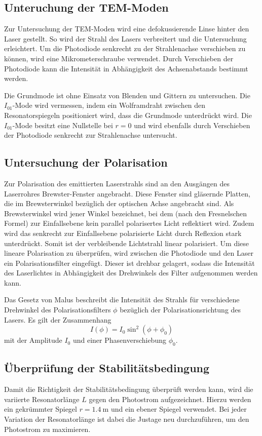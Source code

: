 \subsection{Unteruchung der TEM-Moden}
Zur Untersuchung der TEM-Moden wird eine defokussierende Linse hinter den Laser gestellt.
So wird der Strahl des Lasers verbreitert und die Untersuchung erleichtert.
Um die Photodiode senkrecht zu der Strahlenachse verschieben zu können, wird eine
Mikrometerschraube verwendet. Durch Verschieben der Photodiode kann
die Intensität in Abhängigkeit des Achsenabstands bestimmt werden.

Die Grundmode ist ohne Einsatz von Blenden und Gittern zu untersuchen.
Die $I_{01}$-Mode wird vermessen,
indem ein Wolframdraht zwischen den Resonatorspiegeln positioniert wird,
dass die Grundmode unterdrückt wird.
Die $I_{01}$-Mode besitzt eine Nullstelle bei $r = 0$
und wird ebenfalls durch Verschieben der Photodiode senkrecht zur Strahlenachse
untersucht.

\subsection{Untersuchung der Polarisation}
Zur Polarisation des emittierten Laserstrahls sind an den Ausgängen des
Laserrohres Brewster-Fenster angebracht.
Diese Fenster sind gläsernde Platten, die im Brewsterwinkel bezüglich der
optischen Achse angebracht sind.
Als Brewsterwinkel wird jener Winkel bezeichnet,
bei dem (nach den Fresnelschen Formel) zur
Einfallsebene kein parallel polarisertes Licht reflektiert wird.
Zudem wird das senkrecht zur Einfallsebene polarisierte Licht
durch Reflexion stark unterdrückt.
Somit ist der verbleibende Lichtstrahl linear polarisiert.
Um diese lineare Polarisation zu überprüfen, wird zwischen die Photodiode
und den Laser ein Polarisationsfilter eingefügt.
Dieser ist drehbar gelagert, sodass die Intensität des Laserlichtes in
Abhängigkeit des Drehwinkels des Filter aufgenommen werden kann.

Das Gesetz von Malus beschreibt die Intensität des Strahls für verschiedene
Drehwinkel des Polarisationsfilters $\phi$ bezüglich der Polarisationsrichtung
des Lasers.
Es gilt der Zusammenhang
\begin{equation}
  I\left(\phi\right) = I_0 \sin^2 \left(\phi + \phi_0\right)
  \label{eqn:pol}
\end{equation}
mit der Amplitude $I_0$ und einer Phasenverschiebung $\phi_0$.

\subsection{Überprüfung der Stabilitätsbedingung}
Damit die Richtigkeit der Stabilitätsbedingung überprüft werden kann, wird die
variierte Resonatorlänge $L$ gegen den Photostrom aufgezeichnet. Hierzu
werden ein gekrümmter Spiegel $r=\SI{1.4}{\metre}$ und ein ebener Spiegel verwendet.
Bei jeder Variation der Resonatorlänge ist dabei die Justage neu durchzuführen,
um den Photostrom zu maximieren.
